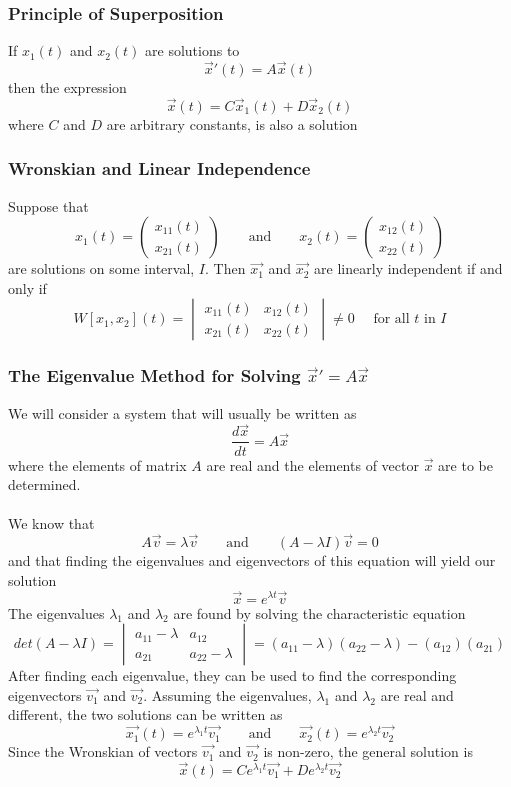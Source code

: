 \documentclass[11pt]{article}
\begin{document}
\subsubsection{Principle of Superposition}
If $x_1(t)$ and $x_2(t)$ are solutions to  $$\vec{x}'(t) = A\vec{x}(t)$$ then the expression $$\vec{x}(t) = C\vec{x}_1(t) + D\vec{x}_2(t)$$ where $C$ and $D$ are arbitrary constants, is also a solution
\subsubsection{Wronskian and Linear Independence}
Suppose that $$x_1(t) = \begin{pmatrix}
x_{11}(t) \\
x_{21}(t)
\end{pmatrix} \quad \quad \text{and} \quad \quad x_2(t) = \begin{pmatrix}
x_{12}(t) \\
x_{22}(t)
\end{pmatrix}$$ are solutions on some interval, $I$. Then $\vec{x_1}$ and $\vec{x_2}$ are linearly independent if and only if 
$$W[x_1, x_2](t) = \begin{vmatrix}
x_{11}(t) & x_{12}(t) \\
x_{21}(t) & x_{22}(t)
\end{vmatrix} \neq 0 \quad \text{  for all $t$ in $I$}$$
\subsubsection{The Eigenvalue Method for Solving $\vec{x}' = A\vec{x}$ }
We will consider a system that will usually be written as
$$\frac{d\vec{x}}{dt} = A\vec{x}$$ where the elements of matrix $A$ are real and the elements of vector $\vec{x}$ are to be determined. \\ \\
We know that $$A\vec{v} = \lambda \vec{v} \quad \quad \text{and} \quad \quad (A-\lambda I)\vec{v} = 0$$ and that finding the eigenvalues and eigenvectors of this equation will yield our solution $$ \vec{x} = e^{\lambda t} \vec{v}$$
The eigenvalues $\lambda_1$ and $\lambda_2$ are found by solving the characteristic equation
$$ det(A - \lambda I) = 
\begin{vmatrix}
a_{11} - \lambda & a_{12} \\
a_{21} & a_{22} - \lambda
\end{vmatrix} = (a_{11} - \lambda)(a_{22} - \lambda) - (a_{12})(a_{21})$$
After finding each eigenvalue, they can be used to find the corresponding eigenvectors $\vec{v_1}$ and $\vec{v_2}$. Assuming the eigenvalues, $\lambda_1$ and $\lambda_2$ are real and different, the two solutions can be written as 
$$\vec{x_1}(t) = e^{\lambda_1 t}\vec{v_1} \quad \quad \text{and} \quad \quad \vec{x_2}(t) = e^{\lambda_2 t}\vec{v_2}$$ Since the Wronskian of vectors $\vec{v_1}$ and $\vec{v_2}$ is non-zero, the general solution is
$$ \vec{x}(t) = Ce^{\lambda_1 t}\vec{v_1} + De^{\lambda_2 t}\vec{v_2}$$
\end{document}
